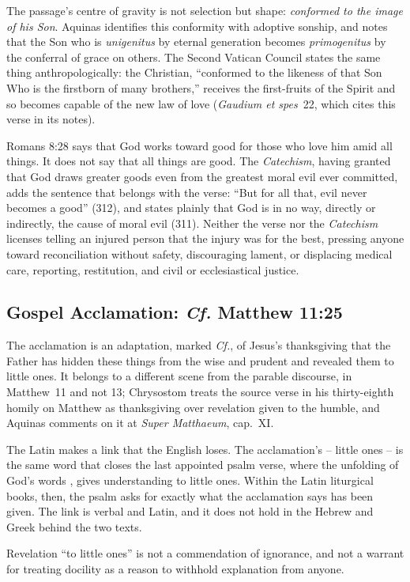 The passage's centre of gravity is not selection but shape: \emph{conformed to the image of his Son}. Aquinas identifies this conformity with adoptive sonship, and notes that the Son who is \emph{unigenitus} by eternal generation becomes \emph{primogenitus} by the conferral of grace on others. The Second Vatican Council states the same thing anthropologically: the Christian, ``conformed to the likeness of that Son Who is the firstborn of many brothers,'' receives the first-fruits of the Spirit and so becomes capable of the new law of love (\emph{Gaudium et spes}~22, which cites this verse in its notes).

Romans 8:28 says that God works toward good for those who love him amid all things. It does not say that all things are good. The \emph{Catechism}, having granted that God draws greater goods even from the greatest moral evil ever committed, adds the sentence that belongs with the verse: ``But for all that, evil never becomes a good'' (312), and states plainly that God is in no way, directly or indirectly, the cause of moral evil (311). Neither the verse nor the \emph{Catechism} licenses telling an injured person that the injury was for the best, pressing anyone toward reconciliation without safety, discouraging lament, or displacing medical care, reporting, restitution, and civil or ecclesiastical justice.

\subsection*{Gospel Acclamation: \emph{Cf.} Matthew 11:25}

The acclamation is an adaptation, marked \emph{Cf.}, of Jesus's thanksgiving that the Father has hidden these things from the wise and prudent and revealed them to little ones. It belongs to a different scene from the parable discourse, in Matthew~11 and not 13; Chrysostom treats the source verse in his thirty-eighth homily on Matthew as thanksgiving over revelation given to the humble, and Aquinas comments on it at \emph{Super Matthaeum}, cap.~XI.

The Latin makes a link that the English loses. The acclamation's  -- little ones -- is the same word that closes the last appointed psalm verse, where the unfolding of God's words , gives understanding to little ones. Within the Latin liturgical books, then, the psalm asks for exactly what the acclamation says has been given. The link is verbal and Latin, and it does not hold in the Hebrew and Greek behind the two texts.

Revelation ``to little ones'' is not a commendation of ignorance, and not a warrant for treating docility as a reason to withhold explanation from anyone.
